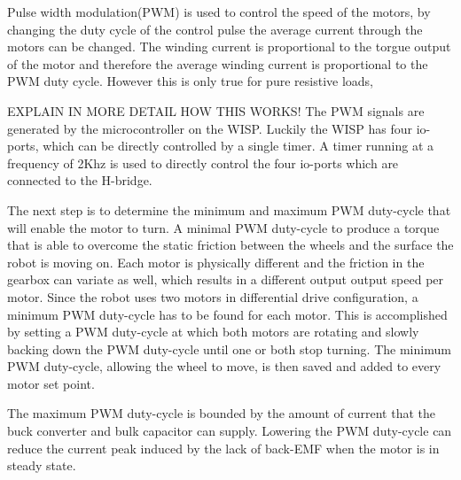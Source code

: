 
Pulse width modulation(PWM) is used to control the speed of the motors, by changing the duty cycle of the control pulse the average current through the motors can be changed.
The winding current is proportional to the torgue output of the motor and therefore the average winding current is proportional to the PWM duty cycle.
However this is only true for pure resistive loads,


EXPLAIN IN MORE DETAIL HOW THIS WORKS!
The PWM signals are generated by the microcontroller on the WISP.
Luckily the WISP has four io-ports, which can be directly controlled by a single timer.%
A timer running at a frequency of 2Khz is used to directly control the four io-ports which are connected to the H-bridge.


The next step is to determine the minimum and maximum PWM duty-cycle that will enable the motor to turn.
A minimal PWM duty-cycle to produce a torque that is able to overcome the static friction between the wheels and the surface the robot is moving on.
Each motor is physically different and the friction in the gearbox can variate as well, which results in a different output output speed per motor.
Since the robot uses two motors in differential drive configuration, a minimum PWM duty-cycle has to be found for each motor.
This is accomplished by setting a PWM duty-cycle at which both motors are rotating and slowly backing down the PWM duty-cycle until one or both stop turning.
The minimum PWM duty-cycle, allowing the wheel to move, is then saved and added to every motor set point.

The maximum PWM duty-cycle is bounded by the amount of current that the buck converter and bulk capacitor can supply.
Lowering the PWM duty-cycle can reduce the current peak induced by the lack of back-EMF when the motor is in steady state.



